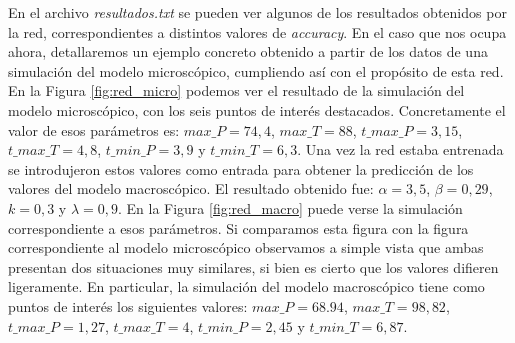 En el archivo \textit{resultados.txt} se pueden ver algunos de los resultados obtenidos por la red, correspondientes a distintos valores de \textit{accuracy}. En el caso que nos ocupa ahora, detallaremos un ejemplo concreto obtenido a partir de los datos de una simulación del modelo microscópico, cumpliendo así con el propósito de esta red. En la Figura \ref{fig:red_micro} podemos ver el resultado de la simulación del modelo microscópico, con los seis puntos de interés destacados. Concretamente el valor de esos parámetros es: $\textit{max\_P} = 74,4$, $\textit{max\_T} = 88$, $\textit{t\_max\_P} = 3,15$, $\textit{t\_max\_T} = 4,8$, $\textit{t\_min\_P} = 3,9$ y  $\textit{t\_min\_T} = 6,3$. Una vez la red estaba entrenada se introdujeron estos valores como entrada para obtener la predicción de los valores del modelo macroscópico. El resultado obtenido fue: $\alpha = 3,5$, $\beta = 0,29$, $k = 0,3$ y $\lambda = 0,9$. En la Figura \ref{fig:red_macro} puede verse la simulación correspondiente a esos parámetros. Si comparamos esta figura con la figura correspondiente al modelo microscópico observamos a simple vista que ambas presentan dos situaciones muy similares, si bien es cierto que los valores difieren ligeramente. En particular, la simulación del modelo macroscópico tiene como puntos de interés los siguientes valores: $\textit{max\_P} = 68.94$, $\textit{max\_T} = 98,82$, $\textit{t\_max\_P} = 1,27$, $\textit{t\_max\_T} =4$, $\textit{t\_min\_P} = 2,45$ y  $\textit{t\_min\_T} = 6,87$.





